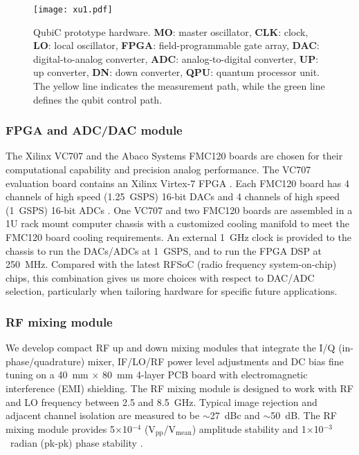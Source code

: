 \documentclass{ieeetran}
\begin{document}
\begin{figure}[t!]
\centering
\texttt{[image: xu1.pdf]}
\caption{QubiC prototype hardware. \textbf{MO}: master oscillator, \textbf{CLK}: clock, \textbf{LO}: local oscillator, \textbf{FPGA}: field-programmable gate array, \textbf{DAC}: digital-to-analog converter, \textbf{ADC}: analog-to-digital converter, \textbf{UP}: up converter, \textbf{DN}: down converter, \textbf{QPU}: quantum processor unit. The yellow line indicates the measurement path, while the green line defines the qubit control path.}
\label{fig:HW}
\end{figure}

\subsubsection{FPGA and ADC/DAC module}
The Xilinx VC707 and the Abaco Systems FMC120 boards are chosen for their computational capability and precision analog performance. 
The VC707 evaluation board contains an Xilinx Virtex-7 FPGA \cite{xilinx2012vc707}. 
Each FMC120 board has 4 channels of high speed (1.25~GSPS) 16-bit DACs and 4 channels of high speed (1~GSPS) 16-bit ADCs \cite{abaco2016fmc120}. 
One VC707 and two FMC120 boards are assembled in a 1U rack mount computer chassis with a customized cooling manifold to meet the FMC120 board cooling requirements. 
An external 1~GHz clock is provided to the chassis to run the DACs/ADCs at 1~GSPS, and to run the FPGA DSP at 250~MHz.
Compared with the latest RFSoC (radio frequency system-on-chip) chips, this combination gives us more choices with respect to DAC/ADC selection, particularly when tailoring hardware for specific future applications. 

\subsubsection{RF mixing module}
We develop compact RF up and down mixing modules that integrate the I/Q (in-phase/quadrature) mixer, IF/LO/RF power level adjustments and DC bias fine tuning on a 40~mm $\times$ 80~mm 4-layer PCB board with electromagnetic interference (EMI) shielding.
The RF mixing module is designed to work with RF and LO frequency between 2.5 and 8.5~GHz. 
Typical image rejection and adjacent channel isolation are measured to be $\sim$27~dBc and $\sim$50~dB. 
The RF mixing module provides 5$\times$10$^{-4}$ (V$_{\mathrm{pp}}$/V$_{\mathrm{mean}}$) amplitude stability and 1$\times$10$^{-3}$~radian (pk-pk) phase stability \cite{xu2020rf}. 
\end{document}
